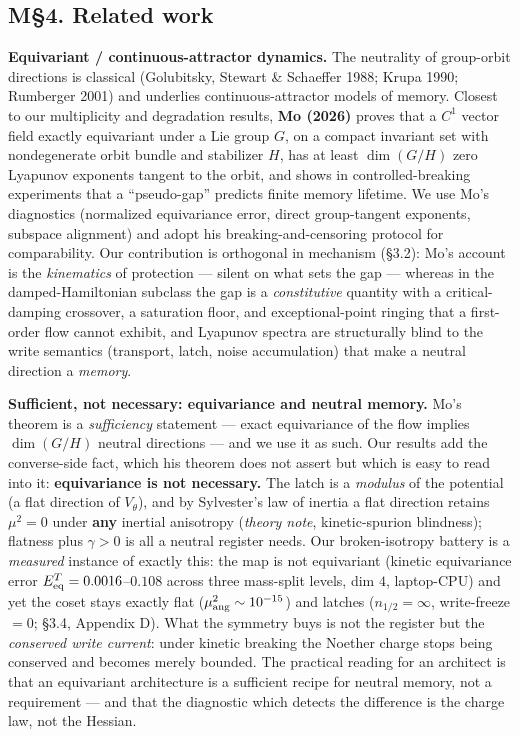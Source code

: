 \documentclass[10pt]{article}
\begin{document}
\subsection*{M\S4. Related work}

\textbf{Equivariant / continuous-attractor dynamics.} The neutrality of group-orbit directions is classical (Golubitsky, Stewart \& Schaeffer 1988; Krupa 1990; Rumberger 2001) and underlies continuous-attractor models of memory. Closest to our multiplicity and degradation results, \textbf{Mo (2026)} proves that a $C^1$ vector field exactly equivariant under a Lie group $G$, on a compact invariant set with nondegenerate orbit bundle and stabilizer $H$, has at least $\dim(G/H)$ zero Lyapunov exponents tangent to the orbit, and shows in controlled-breaking experiments that a ``pseudo-gap'' predicts finite memory lifetime. We use Mo's diagnostics (normalized equivariance error, direct group-tangent exponents, subspace alignment) and adopt his breaking-and-censoring protocol for comparability. Our contribution is orthogonal in mechanism (\S3.2): Mo's account is the \emph{kinematics} of protection --- silent on what sets the gap --- whereas in the damped-Hamiltonian subclass the gap is a \emph{constitutive} quantity with a critical-damping crossover, a saturation floor, and exceptional-point ringing that a first-order flow cannot exhibit, and Lyapunov spectra are structurally blind to the write semantics (transport, latch, noise accumulation) that make a neutral direction a \emph{memory}.

\textbf{Sufficient, not necessary: equivariance and neutral memory.} Mo's theorem is a \emph{sufficiency} statement --- exact equivariance of the flow implies $\dim(G/H)$ neutral directions --- and we use it as such. Our results add the converse-side fact, which his theorem does not assert but which is easy to read into it: \textbf{equivariance is not necessary.} The latch is a \emph{modulus} of the potential (a flat direction of $V_\theta$), and by Sylvester's law of inertia a flat direction retains $\mu^2=0$ under \textbf{any} inertial anisotropy (\emph{theory note}, kinetic-spurion blindness); flatness plus $\gamma>0$ is all a neutral register needs. Our broken-isotropy battery is a \emph{measured} instance of exactly this: the map is not equivariant (kinetic equivariance error $E^T_{\rm eq}=0.0016$--$0.108$ across three mass-split levels, dim $4$, laptop-CPU) and yet the coset stays exactly flat ($\mu^2_{\rm ang}\sim10^{-15}$) and latches ($n_{1/2}=\infty$, write-freeze $=0$; \S3.4, Appendix D). What the symmetry buys is not the register but the \emph{conserved write current}: under kinetic breaking the Noether charge stops being conserved and becomes merely bounded. The practical reading for an architect is that an equivariant architecture is a sufficient recipe for neutral memory, not a requirement --- and that the diagnostic which detects the difference is the charge law, not the Hessian.
\end{document}
